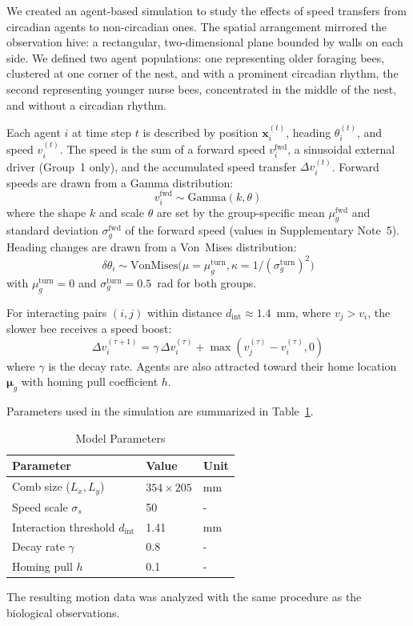 \documentclass{article}
\newcommand{\added}[1]{{\color{blue}#1}}
\newcommand{\added}[1]{#1}
\begin{document}
\added{We created an agent-based simulation to study the effects of speed transfers from circadian agents to non-circadian ones. The spatial arrangement mirrored the observation hive: a rectangular, two-dimensional plane bounded by walls on each side. We defined two agent populations: one representing older foraging bees, clustered at one corner of the nest, and with a prominent circadian rhythm, the second representing younger nurse bees, concentrated in the middle of the nest, and without a circadian rhythm.

Each agent $i$ at time step $t$ is described by position $\mathbf{x}_i^{(t)}$, heading $\theta_i^{(t)}$, and speed $v_i^{(t)}$. The speed is the sum of a forward speed $v_i^{\mathrm{fwd}}$, a sinusoidal external driver (Group~1 only), and the accumulated speed transfer $\Delta v_i^{(t)}$.
Forward speeds are drawn from a Gamma distribution:
\begin{equation}
  v_i^{\mathrm{fwd}} \sim \mathrm{Gamma}(k, \theta)
\end{equation}
where the shape $k$ and scale $\theta$ are set by the group-specific mean $\mu_g^{\mathrm{fwd}}$ and standard deviation $\sigma_g^{\mathrm{fwd}}$ of the forward speed (values in Supplementary Note~5).
Heading changes are drawn from a Von~Mises distribution:
\begin{equation}
  \delta\theta_i \sim \mathrm{VonMises}\bigl(\mu = \mu_g^{\mathrm{turn}}, \kappa = 1/(\sigma_g^{\mathrm{turn}})^2\bigr)
\end{equation}
with $\mu_g^{\mathrm{turn}} = 0$ and $\sigma_g^{\mathrm{turn}} = 0.5$~rad for both groups.

For interacting pairs $(i, j)$ within distance $d_{\mathrm{int}} \approx 1.4$~mm, where $v_j > v_i$, the slower bee receives a speed boost:
\begin{equation}
  \Delta v_i^{(\tau+1)} = \gamma \, \Delta v_i^{(\tau)} + \max(v_j^{(\tau)} - v_i^{(\tau)}, 0)
\end{equation}
where $\gamma$ is the decay rate.
Agents are also attracted toward their home location $\boldsymbol{\mu}_g$ with homing pull coefficient $h$.

Parameters used in the simulation are summarized in Table~\ref{tab:params}.

\begin{table}[h]
\centering
\caption{\added{Model Parameters}}
\label{tab:params}
\begin{tabular}{lll}
\hline
Parameter & Value & Unit \\
\hline
Comb size ($L_x, L_y$) & $354 \times 205$ & mm \\
Speed scale $\sigma_s$ & 50 & - \\
Interaction threshold $d_{\mathrm{int}}$ & 1.41 & mm \\
Decay rate $\gamma$ & 0.8 & - \\
Homing pull $h$ & 0.1 & - \\
\hline
\end{tabular}
\end{table}

The resulting motion data was analyzed with the same procedure as the biological observations.}
\end{document}
